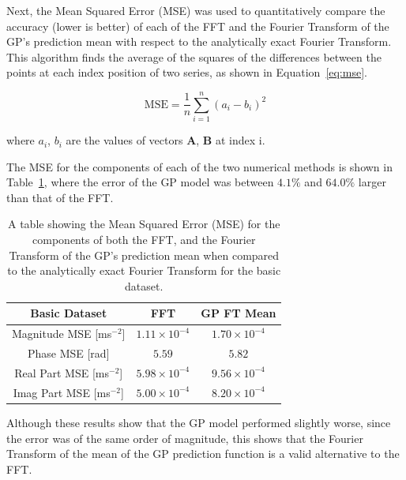 \documentclass[12pt]{article}
\begin{document}
    Next, the Mean Squared Error (MSE) was used to quantitatively compare the accuracy (lower is better) of each of the FFT and the Fourier Transform of the GP's prediction mean with respect to the analytically exact Fourier Transform.
    This algorithm finds the average of the squares of the differences between the points at each index position of two series, as shown in Equation~\ref{eq:mse}.

    \begin{equation}
        \text{MSE} = \frac{1}{n} \sum_{i=1}^{n} (a_i - b_i)^2 \label{eq:mse}
    \end{equation}

    \noindent where $a_i$, $b_i$ are the values of vectors $\mathbf{A}$, $\mathbf{B}$ at index i.

    The MSE for the components of each of the two numerical methods is shown in Table~\ref{tab:basic-mse}, where the error of the GP model was between $4.1\%$ and $64.0\%$ larger than that of the FFT.


    \begin{table}[h]
        \centering %
        \setlength{\arrayrulewidth}{1pt} %
        \begin{tabular}{|c|c|c|} %
            \hline
            Basic Dataset & FFT & GP FT Mean \\ %
            \hline
            Magnitude MSE [ms$^{-2}$] & $1.11 \times 10^{-4}$ & $1.70 \times 10^{-4}$ \\ %
            \hline
            Phase MSE [rad] & $5.59$ & $5.82$ \\ %
            \hline
            Real Part MSE [ms$^{-2}$] & $5.98 \times 10^{-4}$ & $9.56 \times 10^{-4}$ \\ %
            \hline
            Imag Part MSE [ms$^{-2}$] & $5.00 \times 10^{-4}$ & $8.20 \times 10^{-4}$ \\ %
            \hline
        \end{tabular}
        \caption{A table showing the Mean Squared Error (MSE) for the components of both the FFT, and the Fourier Transform of the GP's prediction mean when compared to the analytically exact Fourier Transform for the basic dataset.}
        \label{tab:basic-mse}
    \end{table}


    Although these results show that the GP model performed slightly worse, since the error was of the same order of magnitude, this shows that the Fourier Transform of the mean of the GP prediction function is a valid alternative to the FFT.
\end{document}
